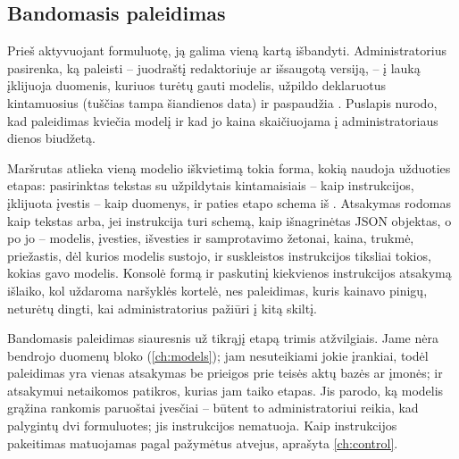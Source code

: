 \subsection{Bandomasis paleidimas}\label{sec:prompts:test}

Prieš aktyvuojant formuluotę, ją galima vieną kartą išbandyti. Administratorius pasirenka, ką
paleisti -- juodraštį redaktoriuje ar išsaugotą versiją, -- į lauką 
įklijuoja duomenis, kuriuos turėtų gauti modelis, užpildo deklaruotus kintamuosius (tuščias
 tampa šiandienos data) ir paspaudžia . Puslapis nurodo, kad
paleidimas kviečia modelį ir kad jo kaina skaičiuojama į administratoriaus dienos biudžetą.

Maršrutas atlieka vieną modelio iškvietimą tokia forma, kokią naudoja užduoties etapas:
pasirinktas tekstas su užpildytais kintamaisiais -- kaip instrukcijos, įklijuota įvestis -- kaip
duomenys, ir paties etapo schema iš . Atsakymas rodomas kaip tekstas arba, jei
instrukcija turi schemą, kaip išnagrinėtas JSON objektas, o po jo -- modelis, įvesties,
išvesties ir samprotavimo žetonai, kaina, trukmė, priežastis, dėl kurios modelis sustojo, ir
suskleistos instrukcijos tiksliai tokios, kokias gavo modelis. Konsolė formą ir paskutinį
kiekvienos instrukcijos atsakymą išlaiko, kol uždaroma naršyklės kortelė, nes paleidimas, kuris
kainavo pinigų, neturėtų dingti, kai administratorius pažiūri į kitą skiltį.

Bandomasis paleidimas siauresnis už tikrąjį etapą trimis atžvilgiais. Jame nėra bendrojo
duomenų bloko (\cref{ch:models}); jam nesuteikiami jokie įrankiai, todėl 
paleidimas yra vienas atsakymas be prieigos prie teisės aktų bazės ar įmonės; ir atsakymui
netaikomos patikros, kurias jam taiko etapas. Jis parodo, ką modelis grąžina rankomis
paruoštai įvesčiai -- būtent to administratoriui reikia, kad palygintų dvi formuluotes; jis
instrukcijos nematuoja. Kaip instrukcijos pakeitimas matuojamas pagal pažymėtus atvejus, aprašyta
\cref{ch:control}.

